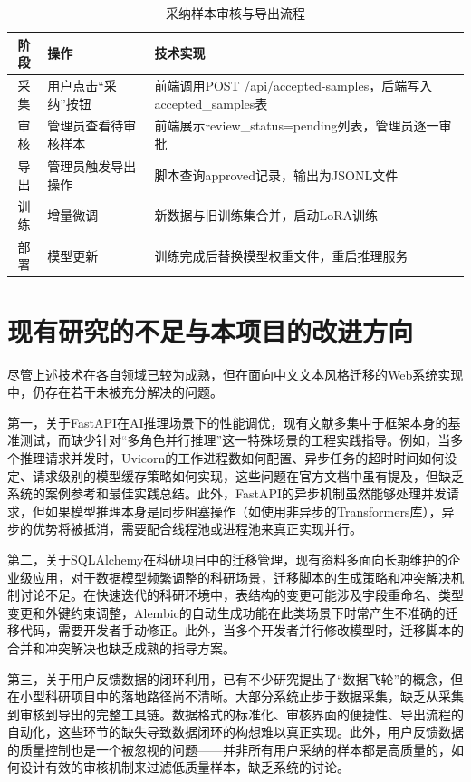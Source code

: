 \documentclass[12pt,a4paper]{ctexart}
\begin{document}
\begin{table}[H]
\centering
\caption{采纳样本审核与导出流程}
\begin{tabular}{c|p{4cm}|p{5cm}}
\toprule
阶段 & 操作 & 技术实现 \\
\midrule
采集 & 用户点击“采纳”按钮 & 前端调用POST /api/accepted-samples，后端写入accepted\_samples表 \\
审核 & 管理员查看待审核样本 & 前端展示review\_status=pending列表，管理员逐一审批 \\
导出 & 管理员触发导出操作 & 脚本查询approved记录，输出为JSONL文件 \\
训练 & 增量微调 & 新数据与旧训练集合并，启动LoRA训练 \\
部署 & 模型更新 & 训练完成后替换模型权重文件，重启推理服务 \\
\bottomrule
\end{tabular}
\end{table}

\section{现有研究的不足与本项目的改进方向}

尽管上述技术在各自领域已较为成熟，但在面向中文文本风格迁移的Web系统实现中，仍存在若干未被充分解决的问题。

第一，关于FastAPI在AI推理场景下的性能调优，现有文献多集中于框架本身的基准测试，而缺少针对“多角色并行推理”这一特殊场景的工程实践指导。例如，当多个推理请求并发时，Uvicorn的工作进程数如何配置、异步任务的超时时间如何设定、请求级别的模型缓存策略如何实现，这些问题在官方文档中虽有提及，但缺乏系统的案例参考和最佳实践总结。此外，FastAPI的异步机制虽然能够处理并发请求，但如果模型推理本身是同步阻塞操作（如使用非异步的Transformers库），异步的优势将被抵消，需要配合线程池或进程池来真正实现并行。

第二，关于SQLAlchemy在科研项目中的迁移管理，现有资料多面向长期维护的企业级应用，对于数据模型频繁调整的科研场景，迁移脚本的生成策略和冲突解决机制讨论不足。在快速迭代的科研环境中，表结构的变更可能涉及字段重命名、类型变更和外键约束调整，Alembic的自动生成功能在此类场景下时常产生不准确的迁移代码，需要开发者手动修正。此外，当多个开发者并行修改模型时，迁移脚本的合并和冲突解决也缺乏成熟的指导方案。

第三，关于用户反馈数据的闭环利用，已有不少研究提出了“数据飞轮”的概念，但在小型科研项目中的落地路径尚不清晰。大部分系统止步于数据采集，缺乏从采集到审核到导出的完整工具链。数据格式的标准化、审核界面的便捷性、导出流程的自动化，这些环节的缺失导致数据闭环的构想难以真正实现。此外，用户反馈数据的质量控制也是一个被忽视的问题——并非所有用户采纳的样本都是高质量的，如何设计有效的审核机制来过滤低质量样本，缺乏系统的讨论。
\end{document}
